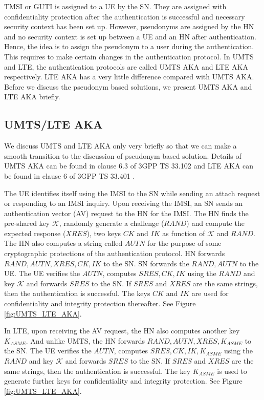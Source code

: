 \documentclass{llncs} %
\begin{document}
TMSI or GUTI is assigned to a UE by the SN. They are assigned with confidentiality protection after the authentication is successful and necessary security context has been set up. However, pseudonyms are assigned by the HN and no security context is set up between a UE and an HN after authentication. Hence, the idea is to assign the pseudonym to a user during the authentication. This requires to make certain changes in the authentication protocol. In UMTS and LTE, the authentication protocols are called UMTS AKA and LTE AKA respectively. LTE AKA has a very little difference compared with UMTS AKA. Before we discuss the pseudonym based solutions, we present UMTS AKA  and LTE AKA briefly.

\subsection{UMTS/LTE AKA}
We discuss UMTS and LTE AKA only very briefly so that we can make a smooth transition to the discussion of pseudonym based solution. Details of UMTS AKA can be found in clause 6.3 of 3GPP TS 33.102 \cite{TS33102} and LTE AKA can be found in clause 6 of 3GPP TS 33.401 \cite{TS33401}. 

The UE identifies itself using the IMSI to the SN while sending an attach request or responding to an IMSI inquiry. Upon receiving the IMSI, an SN sends an authentication vector (AV) request to the HN for the IMSI. The HN finds the pre-shared key $\mathcal{K}$, randomly generate a challenge ($RAND$) and compute the expected response ($XRES$), two keys $CK$ and $IK$ as function of $\mathcal{K}$ and $RAND$. The HN also computes a string called $AUTN$ for the purpose of some cryptographic protections of the authentication protocol. HN forwards $RAND,AUTN,XRES, CK,IK$ to the SN. SN forwards the $RAND,AUTN$ to the UE. The UE verifies the $AUTN$, computes $SRES,CK,IK$ using the $RAND$ and key $\mathcal{K}$ and forwards $SRES$ to the SN. If $SRES$ and $XRES$ are the same strings, then the authentication is successful. The keys $CK$ and $IK$ are used for confidentiality and integrity protection thereafter. See Figure \ref{fig:UMTS_LTE_AKA}.

In LTE, upon receiving the AV request, the HN also computes another key $K_{ASME}$. And unlike UMTS, the HN forwards $RAND,AUTN,XRES,K_{ASME}$ to the SN. The UE verifies the $AUTN$, computes $SRES,CK,IK, K_{ASME}$ using the $RAND$ and key $\mathcal{K}$ and forwards $SRES$ to the SN. If $SRES$ and $XRES$ are the same strings, then the authentication is successful. The key $K_{ASME}$ is used to generate further keys for confidentiality and integrity protection. See Figure \ref{fig:UMTS_LTE_AKA}.
\end{document}
